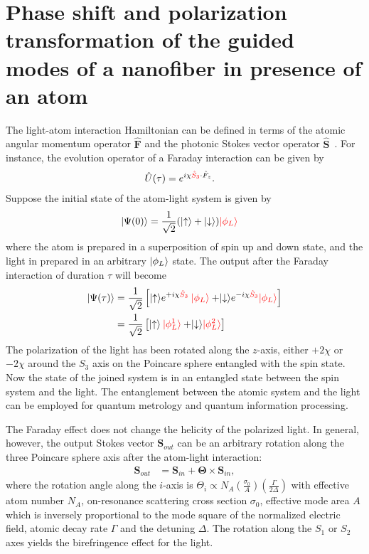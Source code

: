 \documentclass[preprint,aps,pra,onecolumn]{revtex4-1} %
\begin{document}
\section{Phase shift and polarization transformation of the guided modes of a nanofiber in presence of an atom}
The light-atom interaction Hamiltonian can be defined in terms of the atomic angular momentum operator $\hat{\mathbf{F}}$ and the photonic Stokes vector operator $ \hat{\mathbf{S}}$~\cite{Deutsch2010a}. For instance, the evolution operator of a Faraday interaction can be given by
\begin{align}
\hat{U}(\tau)&=e^{i\chi \mathbin{\color{red}{\hat{S}_3}} \cdot \hat{F}_z}.
\end{align}
Suppose the initial state of the atom-light system is given by
\begin{align}
\lvert{\Psi(0)}\rangle &=\frac{1}{\sqrt{2}}(\lvert{\uparrow}\rangle+\lvert{\downarrow}\rangle)\mathbin{\color{red}{\lvert{\phi_L}\rangle}}
\end{align}
where the atom is prepared in a superposition of spin up and down state, and the light in prepared in an arbitrary $\lvert{\phi_L}\rangle$ state. The output after the Faraday interaction of duration $\tau$ will become
\begin{align}
\lvert{\Psi(\tau)}\rangle&=\frac{1}{\sqrt{2}}\left[\lvert{\uparrow}\rangle e^{+i\chi \mathbin{\color{red}{\hat{S}_3}}}\mathbin{\color{red}{\lvert{\phi_L}\rangle}} 
+\lvert{\downarrow}\rangle e^{-i\chi \mathbin{\color{red}{\hat{S}_3}}}\mathbin{\color{red}{\lvert{\phi_L}\rangle}} \right]\\
&=\frac{1}{\sqrt{2}}\left[\lvert{\uparrow}\rangle\mathbin{\color{red}{\lvert{\phi^1_L}\rangle}} 
+\lvert{\downarrow}\rangle\mathbin{\color{red}{\lvert{\phi^2_L}\rangle}} \right]
\end{align}
The polarization of the light has been rotated along the $z$-axis, either $+2\chi$ or $ -2\chi$ around the $S_3$ axis on the Poincare sphere entangled with the spin state. Now the state of the joined system is in an entangled state between the spin system and the light. The entanglement between the atomic system and the light can be employed for quantum metrology and quantum information processing. 

The Faraday effect does not change the helicity of the polarized light. In general, however, the output Stokes vector $\mathbf{S}_{out}$ can be an arbitrary rotation along the three Poincare sphere axis after the atom-light interaction:
\begin{align}
\mathbf{S}_{out} &= \mathbf{S}_{in}+\mathbf{\Theta}\times\mathbf{S}_{in},
\end{align}
where the rotation angle along the $i$-axis is $\Theta_i \propto N_A\left( \frac{\sigma_0}{A}\right) \left(\frac{\Gamma}{2\Delta}\right)$ with effective atom number $N_A$, on-resonance scattering cross section $\sigma_0$, effective mode area $A$ which is inversely proportional to the mode square of the normalized electric field, atomic decay rate $\Gamma$ and the detuning $\Delta$. The rotation along the $S_1$ or $S_2$ axes yields the birefringence effect for the light. 
\end{document}
